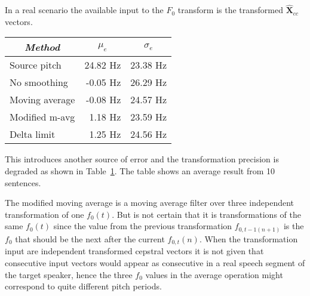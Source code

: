 In a real scenario the available input to the $F_0$ transform is the transformed $\mathbf{\hat{X}}_{cc}$ vectors. 
\begin{table}[htbp]
	\begin{center}
		\label{tab:pitch_pred_transformed_input}	
		\begin{tabular}{lrr}
			\toprule
			\multicolumn{1}{c}{\emph{Method}} & \multicolumn{1}{c}{$\mu_e$} & \multicolumn{1}{c}{$\sigma_e$}\\
			\midrule
			Source pitch & 24.82 Hz & 23.38 Hz\\
			No smoothing & -0.05 Hz  & 26.29 Hz\\
			Moving average & -0.08 Hz  & 24.57 Hz\\
			Modified m-avg & 1.18 Hz & 23.59 Hz\\
			Delta limit & 1.25 Hz & 24.56 Hz \\
			\bottomrule			
		\end{tabular}		
	\end{center}
\end{table}
This introduces another source of error and the transformation precision is degraded as shown in Table~\ref{tab:pitch_pred_transformed_input}. The table shows an average result from 10 sentences.

The modified moving average is a moving average filter over three independent transformation of one $f_0(t)$. But is not certain that it is transformations of the same $f_0(t)$ since the value from the previous transformation $f_{0,t-1(n+1)}$ is the $f_0$ that should be the next after the current $f_{0,t}(n)$. When the transformation input are independent transformed cepstral vectors it is not given that consecutive input vectors would appear as consecutive in a real speech segment of the target speaker, hence the three $f_0$ values in the average operation might correspond to quite different pitch periods.

